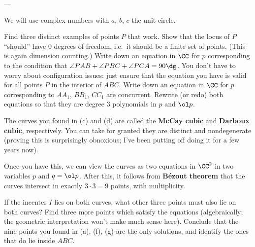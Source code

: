 ---

We will use complex numbers with $a$, $b$, $c$ the unit circle.
\begin{walk}
  \ii Find three distinct examples of points $P$ that work.
  \ii Show that the locus of $P$ ``should'' have $0$ degrees of freedom,
  i.e.\ it should be a finite set of points.
  (This is again dimension counting.)
  \ii Write down an equation in $\CC$ for $p$
  corresponding to the condition that $\angle PAB + \angle PBC + \angle PCA = 90\dg$.
  You don't have to worry about configuration issues:
  just ensure that the equation you have is valid
  for all points $P$ in the interior of $ABC$.
  \ii Write down an equation in $\CC$ for $p$
  corresponding to $AA_1$, $BB_1$, $CC_1$ are concurrent.
  \ii Rewrite (or redo) both equations
  so that they are degree $3$ polynomials in $p$ and $\ol p$.
\end{walk}
The curves you found in (c) and (d)
are called the \textbf{McCay cubic}
and \textbf{Darboux cubic}, respectively.
You can take for granted they are distinct and nondegenerate
(proving this is surprisingly obnoxious;
I've been putting off doing it for a few years now).

Once you have this, we can view the curves
as two equations in $\CC^2$ in two variables $p$ and $q = \ol p$.
After this, it follows from \textbf{B\'{e}zout theorem}
that the curves intersect in exactly $3 \cdot 3 = 9$ points,
with multiplicity.
\begin{walk}[resume]
  \ii If the incenter $I$ lies on both curves,
  what other three points must also lie on both curves?
  \ii Find three more points which
  satisfy the equations (algebraically;
  the geometric interpretation won't make much sense here).
  \ii Conclude that the nine points you found in (a), (f), (g)
  are the only solutions,
  and identify the ones that do lie inside $ABC$.
\end{walk}
